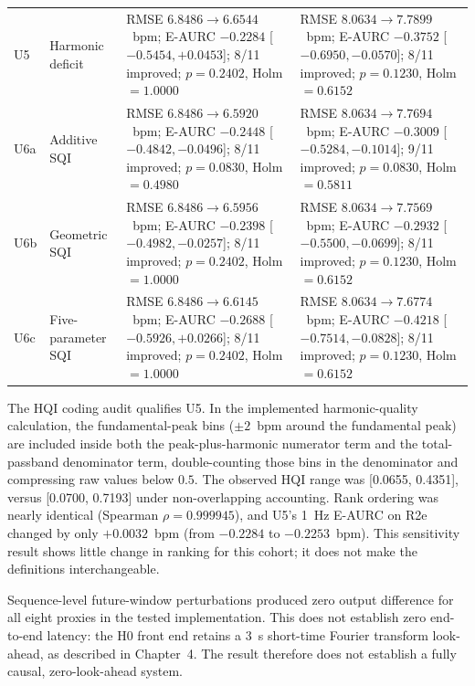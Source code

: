 \begin{table}[htbp]
\begin{tabularx}{\textwidth}{@{}>{\raggedright\arraybackslash}p{0.8cm}>{\raggedright\arraybackslash}p{2.35cm}>{\raggedright\arraybackslash}X >{\raggedright\arraybackslash}X@{}}
\addlinespace[2pt]
U5 & Harmonic deficit & RMSE $6.8486 \rightarrow 6.6544$~bpm; E-AURC $-0.2284$ [$-0.5454,+0.0453$]; 8/11 improved; $p=0.2402$, Holm $=1.0000$ & RMSE $8.0634 \rightarrow 7.7899$~bpm; E-AURC $-0.3752$ [$-0.6950,-0.0570$]; 8/11 improved; $p=0.1230$, Holm $=0.6152$ \\
\addlinespace[2pt]
U6a & Additive SQI & RMSE $6.8486 \rightarrow 6.5920$~bpm; E-AURC $-0.2448$ [$-0.4842,-0.0496$]; 8/11 improved; $p=0.0830$, Holm $=0.4980$ & RMSE $8.0634 \rightarrow 7.7694$~bpm; E-AURC $-0.3009$ [$-0.5284,-0.1014$]; 9/11 improved; $p=0.0830$, Holm $=0.5811$ \\
\addlinespace[2pt]
U6b & Geometric SQI & RMSE $6.8486 \rightarrow 6.5956$~bpm; E-AURC $-0.2398$ [$-0.4982,-0.0257$]; 8/11 improved; $p=0.2402$, Holm $=1.0000$ & RMSE $8.0634 \rightarrow 7.7569$~bpm; E-AURC $-0.2932$ [$-0.5500,-0.0699$]; 8/11 improved; $p=0.1230$, Holm $=0.6152$ \\
\addlinespace[2pt]
U6c & Five-parameter SQI & RMSE $6.8486 \rightarrow 6.6145$~bpm; E-AURC $-0.2688$ [$-0.5926,+0.0266$]; 8/11 improved; $p=0.2402$, Holm $=1.0000$ & RMSE $8.0634 \rightarrow 7.6774$~bpm; E-AURC $-0.4218$ [$-0.7514,-0.0828$]; 8/11 improved; $p=0.1230$, Holm $=0.6152$ \\
\bottomrule
\end{tabularx}
\end{table}

The HQI coding audit qualifies U5. In the implemented harmonic-quality calculation, the fundamental-peak bins ($\pm 2$~bpm around the fundamental peak) are included inside both the peak-plus-harmonic numerator term and the total-passband denominator term, double-counting those bins in the denominator and compressing raw values below $0.5$. The observed HQI range was [0.0655, 0.4351], versus [0.0700, 0.7193] under non-overlapping accounting. Rank ordering was nearly identical (Spearman $\rho=0.999945$), and U5's 1~Hz E-AURC on R2e changed by only $+0.0032$~bpm (from $-0.2284$ to $-0.2253$~bpm). This sensitivity result shows little change in ranking for this cohort; it does not make the definitions interchangeable.

Sequence-level future-window perturbations produced zero output difference for all eight proxies in the tested implementation. This does not establish zero end-to-end latency: the H0 front end retains a 3~s short-time Fourier transform look-ahead, as described in Chapter~4. The result therefore does not establish a fully causal, zero-look-ahead system.

